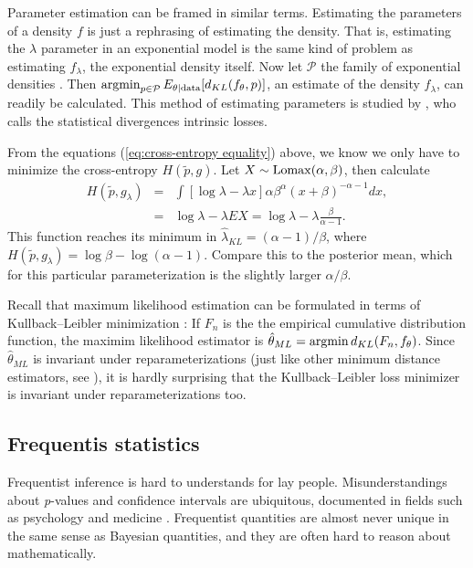 \begin{example}
Parameter estimation can be framed in similar terms. Estimating the
parameters of a density $f$ is just a rephrasing of estimating the
density. That is, estimating the $\lambda$ parameter in an
exponential model is the same kind of problem as estimating $f_{\lambda}$,
the exponential density itself. Now let $\mathcal{P}$ the family
of exponential densities . Then $\operatorname{argmin}_{p\in\mathcal{P}}E_{\theta\mid\textrm{data}}[d_{KL}(f_{\theta},p)]$,
an estimate of the density $f_{\lambda}$, can readily be calculated.
This method of estimating parameters is studied by \cite{Robert1996-ii},
who calls the statistical divergences intrinsic losses. 

From the equations (\ref{eq:cross-entropy equality}) above, we know
we only have to minimize the cross-entropy $H(\tilde{p},g)$. Let
$X\sim\operatorname{Lomax}(\alpha,\beta)$, then calculate
\begin{eqnarray*}
H(\tilde{p},g_{\lambda}) & = & \int[\log\lambda-\lambda x]\alpha\beta^{\alpha}(x+\beta)^{-\alpha-1}dx,\\
 & = & \log\lambda-\lambda EX=\log\lambda-\lambda\frac{\beta}{\alpha-1}.
\end{eqnarray*}
This function reaches its minimum in $\hat{\lambda}_{KL}=(\alpha-1)/\beta$,
where $H(\tilde{p},g_{\lambda})=\log\beta-\log(\alpha-1)$. Compare
this to the posterior mean, which for this particular parameterization
is the slightly larger $\alpha/\beta$. 

Recall that maximum likelihood estimation can be formulated in terms
of Kullback--Leibler minimization \parencite[p. 25]{Claeskens2008-hk}:
If $F_{n}$ is the the empirical cumulative distribution function,
the maximim likelihood estimator is $\hat{\theta}_{ML}=\operatorname{argmin} d_{KL}(F_{n},f_{\theta})$.
Since $\hat{\theta}_{ML}$ is invariant under reparameterizations
(just like other minimum distance estimators, see \cite{Drossos1980-ar}),
it is hardly surprising that the Kullback--Leibler loss minimizer
is invariant under reparameterizations too. 
\end{example}


\subsection{Frequentis statistics}

Frequentist inference is hard to understands for lay people. Misunderstandings
about \emph{p}-values and confidence intervals are ubiquitous, documented
in fields such as psychology \parencite{Belia2005-di,Gigerenzer2018-oi}
and medicine \parencite{Goodman2008-ed,Gigerenzer2007-qi}. Frequentist quantities are almost never unique in the same
sense as Bayesian quantities, and they are often hard to reason about
mathematically. 


